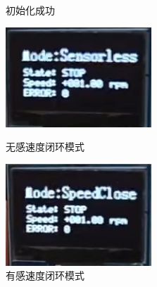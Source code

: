 ﻿\documentclass[12pt,a4paper]{article}
\begin{document}
\begin{figure}[!htbp]
\begin{minipage}{0.29\linewidth}
    \caption{初始化成功}
  \end{minipage} 	%
  \begin{minipage}{0.29\linewidth}
    \centering
    \includegraphics[width=\linewidth]{picture/MODE7.png}
    \caption{无感速度闭环模式}
    \label{chutian3}%
  \end{minipage}
  \begin{minipage}{0.29\linewidth}
    \centering
    \includegraphics[width=\linewidth]{picture/MODE6.png}
    \caption{有感速度闭环模式}
    \label{test4}%
  \end{minipage}
  \begin{minipage}{0.29\linewidth}
    \centering

\end{minipage}
\end{figure}
\end{document}

